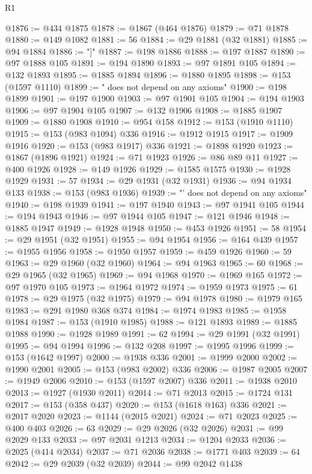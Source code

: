 \begin{lexlean}{R1}
\begin{coremodule}
@1876 := @434 @1875
@1878 := @1867 (@464 @1876)
@1879 := @71 @1878
@1880 := @149 @1082
@1881 := 56
@1884 := @29 @1881 (@32 @1881)
@1885 := @94 @1884
@1886 := "]"
@1887 := @198 @1886
@1888 := @197 @1887
@1890 := @97 @1888 @105
@1891 := @194 @1890
@1893 := @97 @1891 @105
@1894 := @132 @1893
@1895 := @1885 @1894
@1896 := @1880 @1895
@1898 := @153 (@1597 @1110)
@1899 := " does not depend on any axioms"
@1900 := @198 @1899
@1901 := @197 @1900
@1903 := @97 @1901 @105
@1904 := @194 @1903
@1906 := @97 @1904 @105
@1907 := @132 @1906
@1908 := @1885 @1907
@1909 := @1880 @1908
@1910 := @954 @158
@1912 := @153 (@1910 @1110)
@1915 := @153 (@983 @1094) @336
@1916 := @1912 @1915
@1917 := @1909 @1916
@1920 := @153 (@983 @1917) @336
@1921 := @1898 @1920
@1923 := @1867 (@1896 @1921)
@1924 := @71 @1923
@1926 := @86 @89 @11
@1927 := @400 @1926
@1928 := @149 @1926
@1929 := @1585 @1575
@1930 := @1928 @1929
@1931 := 57
@1934 := @29 @1931 (@32 @1931)
@1936 := @94 @1934 @133
@1938 := @153 (@983 @1936)
@1939 := "' does not depend on any axioms"
@1940 := @198 @1939
@1941 := @197 @1940
@1943 := @97 @1941 @105
@1944 := @194 @1943
@1946 := @97 @1944 @105
@1947 := @121 @1946
@1948 := @1885 @1947
@1949 := @1928 @1948
@1950 := @453 @1926
@1951 := 58
@1954 := @29 @1951 (@32 @1951)
@1955 := @94 @1954
@1956 := @164 @439
@1957 := @1955 @1956
@1958 := @1950 @1957
@1959 := @459 @1926
@1960 := 59
@1963 := @29 @1960 (@32 @1960)
@1964 := @94 @1963
@1965 := 60
@1968 := @29 @1965 (@32 @1965)
@1969 := @94 @1968
@1970 := @1969 @165
@1972 := @97 @1970 @105
@1973 := @1964 @1972
@1974 := @1959 @1973
@1975 := 61
@1978 := @29 @1975 (@32 @1975)
@1979 := @94 @1978
@1980 := @1979 @165
@1983 := @291 @1980 @368 @374
@1984 := @1974 @1983
@1985 := @1958 @1984
@1987 := @153 (@1910 @1985)
@1988 := @121 @1893
@1989 := @1885 @1988
@1990 := @1928 @1989
@1991 := 62
@1994 := @29 @1991 (@32 @1991)
@1995 := @94 @1994
@1996 := @132 @208
@1997 := @1995 @1996
@1999 := @153 (@1642 @1997)
@2000 := @1938 @336
@2001 := @1999 @2000
@2002 := @1990 @2001
@2005 := @153 (@983 @2002) @336
@2006 := @1987 @2005
@2007 := @1949 @2006
@2010 := @153 (@1597 @2007) @336
@2011 := @1938 @2010
@2013 := @1927 (@1930 @2011)
@2014 := @71 @2013
@2015 := @1724 @131
@2017 := @153 (@358 @437)
@2020 := @153 (@1618 @163) @336
@2021 := @2017 @2020
@2023 := @1144 (@2015 @2021)
@2024 := @71 @2023
@2025 := @400 @403
@2026 := 63
@2029 := @29 @2026 (@32 @2026)
@2031 := @99 @2029 @133
@2033 := @97 @2031 @1213
@2034 := @1204 @2033
@2036 := @2025 (@414 @2034)
@2037 := @71 @2036
@2038 := @1771 @403
@2039 := 64
@2042 := @29 @2039 (@32 @2039)
@2044 := @99 @2042 @1438

\end{coremodule}
\end{lexlean}
